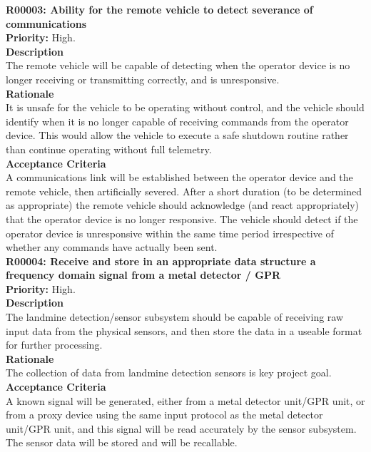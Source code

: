 \documentclass[main.tex]{subfiles}
\begin{document}
\begin{appendices}
\textbf{R00003: Ability for the remote vehicle to detect severance of communications}\\
\textbf{Priority:} High.\\
\textbf{Description}\\
The remote vehicle will be capable of detecting when the operator device is no longer receiving or transmitting correctly, and is unresponsive.\\
\textbf{Rationale}\\
It is unsafe for the vehicle to be operating without control, and the vehicle should identify when it is no longer capable of receiving commands from the operator device. This would allow the vehicle to execute a safe shutdown routine rather than continue operating without full telemetry.\\
\textbf{Acceptance Criteria}\\
A communications link will be established between the operator device and the remote vehicle, then artificially severed. After a short duration (to be determined as appropriate) the remote vehicle should acknowledge (and react appropriately) that the operator device is no longer responsive. The vehicle should detect if the operator device is unresponsive within the same time period irrespective of whether any commands have actually been sent.\\
 
\textbf{R00004: Receive and store in an appropriate data structure a frequency domain signal from a metal detector / GPR}\\
\textbf{Priority:} High.\\
\textbf{Description}\\
The landmine detection/sensor subsystem should be capable of receiving raw input data from the physical sensors, and then store the data in a useable format for further processing.\\
\textbf{Rationale}\\
The collection of data from landmine detection sensors is key project goal.\\
\textbf{Acceptance Criteria}\\
A known signal will be generated, either from a metal detector unit/GPR unit, or from a proxy device using the same input protocol as the metal detector unit/GPR unit, and this signal will be read accurately by the sensor subsystem. The sensor data will be stored and will be recallable.


\end{appendices}
\end{document}
